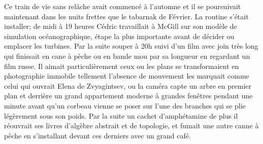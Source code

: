 \documentclass{article}
\begin{document}
Ce train de vie sans relâche avait commencé à l'automne et il se poursuivait
maintenant dans les nuits frettes que le tabarnak de Février. La routine s'était
installer; de midi à 19 heures Cédric travaillait à McGill sur son modèle de
simulation océanographique, étape la plus importante avant de décider ou
emplacer les turbines. Par la suite souper à 20h suivi d'un film avec join très
long qui finissait en cane à pèche ou en bande mou par sa longueur en regardant
un film russe. Il aimait particulièrement ceux ou les plans se transformaient en
photographie immobile tellement l'absence de mouvement les marquait comme celui
qui ouvrait Elena de Zvyagintsev, ou la caméra capte un arbre en premier plan et
derrière un grand appartement moderne à grandes fenêtres pendant une minute
avant qu'un corbeau vienne se poser sur l'une des branches qui se plie
légèrement sous son poids. Par la suite un cachet d'amphétamine de plus il
réouvrait ses livres d'algèbre abstrait et de topologie, et fumait une autre
canne à pêche en s'installant devant ces derniers avec un grand café.\\
\end{document}
